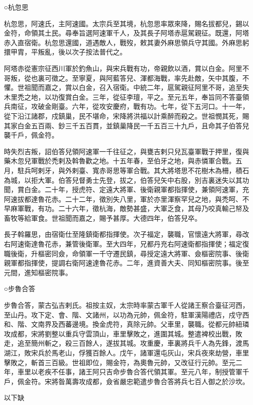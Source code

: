 
\begin{pinyinscope}

 ○杭忽思



 杭忽思，阿速氏，主阿速國。太宗兵至其境，杭忽思率眾來降，賜名拔都兒，錫以金符，命領其土民。尋奉旨選阿速軍千人，及其長子阿塔赤扈駕親征。既還，阿塔赤入直宿衛。杭忽思還國，道遇敵人，戰歿，敕其妻外麻思領兵守其國。外麻思躬擐甲胄，平叛亂，後以次子按法普代之。



 阿塔赤從憲宗征西川軍於釣魚山，與宋兵戰有功，帝親飲以酒，賞以白金。阿里不哥叛，從也裏可徵之。至寧夏，與阿藍答兒、渾都海戰，率先赴敵，矢中其腹，不懼。世祖聞而嘉之，賞以白金，召入宿衛。中統二年，扈駕親征阿里不哥，追至失木里禿之地，以功復賞白金。三年，從征李璮，平之。至元五年，奉旨同不答臺領兵南征，攻破金剛臺。六年，從攻安慶府，戰有功。七年，從下五河口。十一年，從下沿江諸郡，戍鎮巢，民不堪命，宋降將洪福以計乘醉而殺之。世祖憫其死，賜其家白金五百兩、鈔三千五百貫，並鎮巢降民一千五百三十九戶，且命其子伯答兒襲千戶，佩金符。



 時失烈吉叛，詔伯答兒領阿速軍一千往征之，與甕吉剌只兒瓦臺軍戰于押里，復與藥木忽兒軍戰於禿剌及斡魯歡之地。十五年春，至伯牙之地，與赤憐軍合戰。五月，駐兵呵剌牙，與外剌臺、寬赤哥思等軍合戰。其大將塔思不花樹木為柵，積石為城，以拒大軍。伯答兒督勇士先登，拔之，伯答兒矢中右股，別吉裏迷失以其功聞，賞白金。二十年，授虎符、定遠大將軍、後衛親軍都指揮使，兼領阿速軍，充阿速拔都達魯花赤。二十二年，徵別失八里，軍於亦里渾察罕兒之地，與禿呵、不早麻軍戰，有功。二十六年，徵杭海，敵勢甚盛，大軍乏食，其母乃咬真輸己帑及畜牧等給軍食。世祖聞而嘉之，賜予甚厚。大德四年，伯答兒卒。



 長子斡羅思，由宿衛仕至隆鎮衛都指揮使。次子福定，襲職，官懷遠大將軍，尋改右阿速衛達魯花赤，兼管後衛軍。至大四年，兄都丹充右阿速衛都指揮使；福定復職後衛，升樞密同僉，命領軍一千守遷民鎮，尋授定遠大將軍、僉樞密院事、後衛親軍都指揮使，提調右衛阿速達魯花赤。二年，進資善大夫、同知樞密院事。後至元間，進知樞密院事。



 ○步魯合答



 步魯合答，蒙古弘吉剌氏。祖按主奴，太宗時率蒙古軍千人從諸王察合臺征河西，至山丹。攻下定、會、階、文諸州，以功為元帥，佩金符，駐軍漢陽禮店，戍守西和、階、文南界及西蕃邊境。換金虎符，真除元帥。父車里，襲職。從都元帥紐璘攻成都，宋將劉整以重兵守雲頂山，車里擊敗之，進圍其城。整遣裨校出戰，敗走，追至簡州斬之，殺三百餘人，遂拔其城。攻重慶，車裏將兵千人為先鋒，渡馬湖江，敗宋兵於馬老山，俘獲百餘人。戊午，諸軍還屯灰山，宋兵夜來劫營，車里擊敗之，斬首三百級。世祖即位，賜金符，為奧魯元帥，又改征行元帥。至元二年，車里以老疾不任事，諸王阿只吉命步魯合答代領其軍。至元八年，制授管軍千戶，佩金符。宋將昝萬壽攻成都，僉省嚴忠範遣步魯合答將兵七百人御之於沙坎。



 以下缺



\end{pinyinscope}